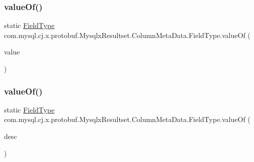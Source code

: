 \subsubsection{\texorpdfstring{value\+Of()}{valueOf()}\hspace{0.1cm}{\footnotesize\ttfamily [1/2]}}
{\footnotesize\ttfamily static \mbox{\hyperlink{enumcom_1_1mysql_1_1cj_1_1x_1_1protobuf_1_1_mysqlx_resultset_1_1_column_meta_data_1_1_field_type}{Field\+Type}} com.\+mysql.\+cj.\+x.\+protobuf.\+Mysqlx\+Resultset.\+Column\+Meta\+Data.\+Field\+Type.\+value\+Of (\begin{DoxyParamCaption}\item[{int}]{value }\end{DoxyParamCaption})\hspace{0.3cm}{\ttfamily [static]}}

\mbox{\label{enumcom_1_1mysql_1_1cj_1_1x_1_1protobuf_1_1_mysqlx_resultset_1_1_column_meta_data_1_1_field_type_ada318b207cf853a321d68c51c47f6936}} 
\subsubsection{\texorpdfstring{value\+Of()}{valueOf()}\hspace{0.1cm}{\footnotesize\ttfamily [2/2]}}
{\footnotesize\ttfamily static \mbox{\hyperlink{enumcom_1_1mysql_1_1cj_1_1x_1_1protobuf_1_1_mysqlx_resultset_1_1_column_meta_data_1_1_field_type}{Field\+Type}} com.\+mysql.\+cj.\+x.\+protobuf.\+Mysqlx\+Resultset.\+Column\+Meta\+Data.\+Field\+Type.\+value\+Of (\begin{DoxyParamCaption}\item[{com.\+google.\+protobuf.\+Descriptors.\+Enum\+Value\+Descriptor}]{desc }\end{DoxyParamCaption})\hspace{0.3cm}{\ttfamily [static]}}



